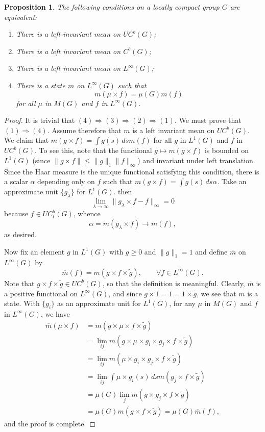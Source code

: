 \documentclass{book}
\newtheorem{proposition}[definition]{Proposition}
\begin{document}
\begin{proposition}\label{Petersen:734}
  The following conditions on a locally compact group \(G\) are equivalent:
  \begin{enumerate}
    \item There is a left invariant mean on \(UC^b(G)\);
    \item There is a left invariant mean on \(C^b(G)\);
    \item There is a left invariant mean on \(L^\infty(G)\);
    \item There is a state \(m\) on \(L^\infty(G)\) such that
      \[
        m(\mu\times f)=\mu(G)m(f)
      \]
      for all \(\mu\) in \(M(G)\) and \(f\) in \(L^\infty(G)\).
  \end{enumerate}
\end{proposition}
\begin{proof}
  It is trivial that \((4) \Rightarrow (3) \Rightarrow (2) \Rightarrow (1)\). We must prove that \((1) \Rightarrow (4)\).
  Assume therefore that \(m\) is a left invariant mean on \(UC^b(G)\). We claim that
  \(m(g \times f)= \int g(s)\,ds m(f)\) for all \(g\) in \(L^1(G)\) and \(f\) in \(UC^b(G)\). To see this,
  note that the functional \(g \mapsto m(g \times f)\) is bounded on \(L^1(G)\) (since 
  \(\|g \times f\|\leq \|g\|_1\|f\|_\infty\)) and invariant under left translation. Since the Haar measure is the
  unique functional satisfying this condition, there is a scalar \(\alpha\) depending only on
  \(f\) such that \(m(g \times f)= \int g(s)\,ds\alpha\). Take an approximate unit \(\{g_\lambda\}\) for \(L^1(G)\).  
  then
  \[
    \lim_{\lambda\rightarrow\infty}\|g_\lambda\times f - f\|_\infty=0
  \]
  because \(f\in UC_l^b(G)\), whence
  \[
    \alpha=m(g_\lambda\times f)\rightarrow m(f),
  \]
  as desired.\par
  Now fix an element \(g\) in \(L^1(G)\) with \(g\geq 0\) and \(\|g\|_1=1\) and define \(\overline{m}\) on \(L^\infty(G)\) by
  \[
    \overline{m}(f)=m(g\times f\times \tilde{g}),\qquad\forall f\in L^\infty(G).
  \]
  Note that \(g\times f\times \tilde{g}\in UC^b(G)\), so that the definition is meaningful.
  Clearly, \(\overline{m}\) is a positive functional on \(L^\infty(G)\), and since \(g\times 1=1=1\times\tilde{g}\), we see that
  \(\overline{m}\) is a state. With \(\{g_i\}\) as an approximate unit for \(L^1(G)\),
  for any \(\mu\) in \(M(G)\) and \(f\) in \(L^\infty(G)\), we have
  \begin{align*}
    \overline{m}(\mu\times f)&=m(g\times \mu\times f\times\tilde{g})\\
    &=\lim_{ij}m(g\times \mu\times g_i\times g_j\times f\times\tilde{g})\\
    &=\lim_{ij}m(\mu\times g_i\times g_j\times f\times\tilde{g})\\
    &=\lim_{ij}\int\mu\times g_i(s)\,ds m(g_j\times f\times\tilde{g})\\
    &=\mu(G)\lim_{j}m(g\times g_j\times f\times\tilde{g})\\
    &=\mu(G)m(g\times f\times\tilde{g})=\mu(G)\overline{m}(f),
  \end{align*}
  and the proof is complete.
\end{proof}
\end{document}
